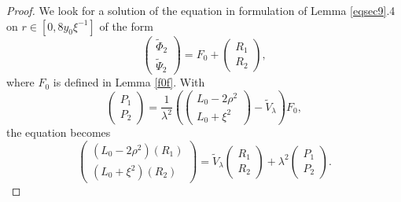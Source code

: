 \documentclass[11 pt]{amsart}
\theoremstyle{definition}
\theoremstyle{remark}
\numberwithin{equation}{section}
\begin{document}
\begin{proof}
  We look for a solution of the equation in formulation of Lemma
  \ref{eqsec9}.4 on $r \in [0, 8 y_0 \xi^{- 1}]$ of the form
  \[ \left(\begin{array}{c}
       \widetilde{\Phi}_2\\
       \widetilde{\Psi}_2
     \end{array}\right) = F_0 + \left(\begin{array}{c}
       R_1\\
       R_2
     \end{array}\right), \]
  where $F_0$ is defined in Lemma \ref{f0f}. With
  \[ \left(\begin{array}{c}
       P_1\\
       P_2
     \end{array}\right) = \frac{1}{\lambda^2} \left(
     \left(\begin{array}{c}
       L_0 - 2 \rho^2\\
       L_0 + \xi^2
     \end{array}\right) - \widetilde{V}_{\lambda} \right) F_0, \]
  the equation becomes
  \begin{equation}
    \left(\begin{array}{c}
      (L_0 - 2 \rho^2) (R_1)\\
      (L_0 + \xi^2) (R_2)
    \end{array}\right) = \widetilde{V}_{\lambda} \left(\begin{array}{c}
      R_1\\
      R_2
    \end{array}\right) + \lambda^2 \left(\begin{array}{c}
      P_1\\
      P_2
    \end{array}\right) . \label{heatbeatmeteora}
  \end{equation}
  

\end{proof}
\end{document}
